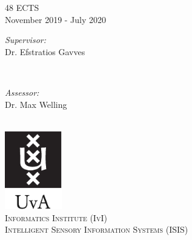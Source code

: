 \documentclass[11pt]{article}
\begin{document}
\begin{titlepage}
48 ECTS\\ %
November 2019 - July 2020\\[1cm]%

\begin{minipage}[t]{0.4\textwidth}
\begin{flushleft} \large
\emph{Supervisor:} \\
Dr. Efstratios Gavves\\
\end{flushleft}
\end{minipage}
~
\begin{minipage}[t]{0.4\textwidth}
\begin{flushright} \large
\emph{Assessor:} \\
Dr. Max Welling\\
\end{flushright}
\end{minipage}\\[2cm]


\includegraphics[width=2.5cm]{figures/uvaLogo.pdf}\\[0.5cm] %
\textsc{\large Informatics Institute (IvI)\\Intelligent Sensory Information Systems (ISIS)}\\[1.0cm] %
 

\vfill %

\end{titlepage}
\end{document}
